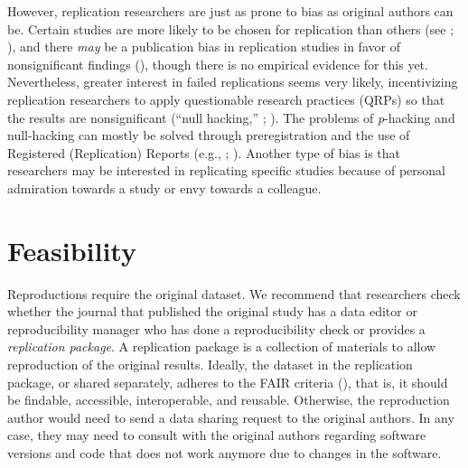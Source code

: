 \documentclass[
  letterpaper,
  DIV=11,
  openany,
  fontsize=12pt,
  parskip=half,
  headings=big,
  numbers=noenddot,
  titlepage=false]{scrreprt}
\begin{document}
However, replication researchers are just as prone to bias as original
authors can be. Certain studies are more likely to be chosen for
replication than others (see ; ), and there \emph{may}
be a publication bias in replication studies in favor of nonsignificant
findings (), though there is no empirical evidence for this yet.
Nevertheless, greater interest in failed replications seems very likely,
incentivizing replication researchers to apply questionable research
practices (QRPs) so that the results are nonsignificant (``null
hacking,'' ;
).
The problems of \emph{p}-hacking and null-hacking can mostly be solved
through preregistration and the use of Registered (Replication) Reports
(e.g., ;
). Another type
of bias is that researchers may be interested in replicating specific
studies because of personal admiration towards a study or envy towards a
colleague.

\section{Feasibility}\label{feasibility}

Reproductions require the original dataset. We recommend that
researchers check whether the journal that published the original study
has a data editor or reproducibility manager who has done a
reproducibility check or provides a \emph{replication package}. A
replication package is a collection of materials to allow reproduction
of the original results. Ideally, the dataset in the replication
package, or shared separately, adheres to the FAIR criteria
(), that is, it
should be findable, accessible, interoperable, and reusable. Otherwise,
the reproduction author would need to send a data sharing request to the
original authors. In any case, they may need to consult with the
original authors regarding software versions and code that does not work
anymore due to changes in the software.
\end{document}
